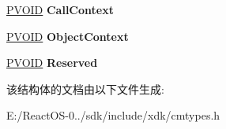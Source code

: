 \begin{DoxyCompactItemize}
\hyperlink{interfacevoid}{P\+V\+O\+ID} {\bfseries Call\+Context}
\item 
\mbox{\label{struct___r_e_g___q_u_e_r_y___k_e_y___i_n_f_o_r_m_a_t_i_o_n_a9ab3d651c788636b3b1ba80f01ad3ed3}} 
\hyperlink{interfacevoid}{P\+V\+O\+ID} {\bfseries Object\+Context}
\item 
\mbox{\label{struct___r_e_g___q_u_e_r_y___k_e_y___i_n_f_o_r_m_a_t_i_o_n_af81d10c66f4dc38f0b91bcce1685b910}} 
\hyperlink{interfacevoid}{P\+V\+O\+ID} {\bfseries Reserved}
\end{DoxyCompactItemize}


该结构体的文档由以下文件生成\+:\begin{DoxyCompactItemize}
\item 
E\+:/\+React\+O\+S-\/0../sdk/include/xdk/cmtypes.\+h\end{DoxyCompactItemize}
